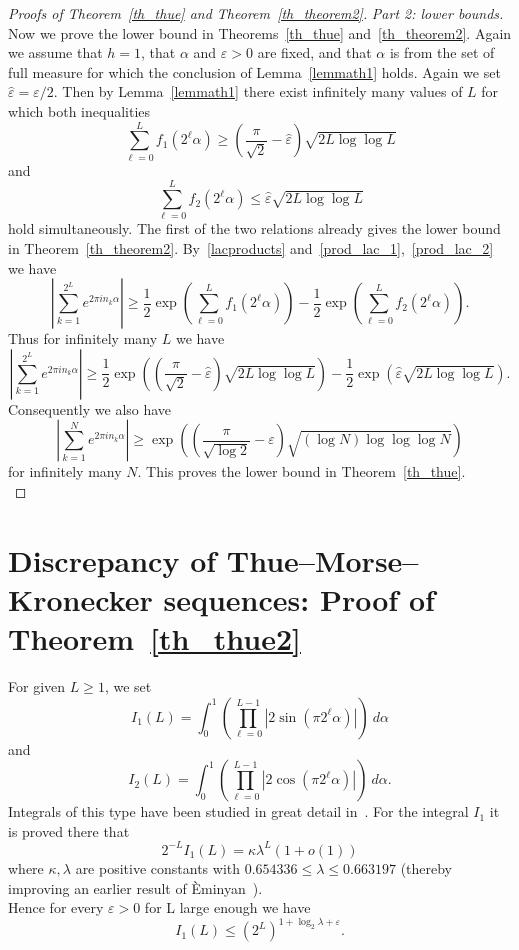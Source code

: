 \documentclass[12pt]{amsart}
\newcommand {\ve} {\varepsilon}
\begin{document}
\begin{proof}[Proofs of Theorem~\ref{th_thue} and Theorem~\ref{th_theorem2}]
\emph{Part 2: lower bounds.} \quad Now we prove the lower bound in Theorems~\ref{th_thue} and~\ref{th_theorem2}. Again we assume that $h=1$, that $\alpha$ and $\ve>0$ are fixed, and that $\alpha$ is from the set of full measure for which the conclusion of Lemma~\ref{lemmath1} holds. Again we set $\hat{\ve} = \ve/2$. Then by Lemma~\ref{lemmath1} there exist infinitely many values of $L$ for which both inequalities
$$
\sum_{\ell=0}^{L} f_1(2^\ell \alpha) \geq \left(\frac{\pi}{\sqrt{2}} - \hat{\ve}\right) \sqrt{2 L \log \log L}
$$
and
$$
\sum_{\ell=0}^{L} f_2(2^\ell \alpha) \leq \hat{\ve} \sqrt{2 L \log \log L}
$$
hold simultaneously. The first of the two relations already gives the lower bound in Theorem~\ref{th_theorem2}. By~\eqref{lacproducts} and~\eqref{prod_lac_1},~\eqref{prod_lac_2} we have
\begin{equation*} 
\left| \sum_{k=1}^{2^L} e^{2 \pi i n_k \alpha} \right| \geq \frac{1}{2} \exp \left(\sum_{\ell=0}^{L} f_1(2^\ell \alpha) \right) - \frac{1}{2} \exp\left(\sum_{\ell=0}^{L} f_2(2^\ell \alpha) \right).
\end{equation*}
Thus for infinitely many $L$ we have
\begin{equation} 
\left|\sum_{k=1}^{2^L} e^{2 \pi i n_k \alpha} \right| \geq \frac{1}{2} \exp \left(\left(\frac{\pi}{\sqrt{2}} - \hat{\ve}\right) \sqrt{2 L \log \log L}\right) - \frac{1}{2} \exp \left(\hat{\ve} \sqrt{2 L \log \log L}\right).
\end{equation}
Consequently we also have
$$
\left|\sum_{k=1}^{N} e^{2 \pi i n_k \alpha} \right| \geq \exp \left(\left(\frac{\pi}{\sqrt{\log 2}} - \ve \right) \sqrt{(\log N) \log \log \log N}\right)
$$
for infinitely many $N$. This proves the lower bound in Theorem~\ref{th_thue}.\\
\end{proof}

\section{Discrepancy of Thue--Morse--Kronecker sequences: Proof of Theorem~\ref{th_thue2}} \label{sect_proof_th2}

For given $L \geq 1$, we set
$$
I_1 (L) = \int_0^1 \left( \prod_{\ell=0}^{L-1} \left|2 \sin (\pi 2^\ell \alpha)\right| \right)~d\alpha
$$
and
$$
I_2 (L) = \int_0^1 \left( \prod_{\ell=0}^{L-1} \left|2 \cos(\pi 2^\ell \alpha)\right| \right)~d\alpha.
$$
Integrals of this type have been studied in great detail in~\cite{foumau}. For the integral $I_1$ it is proved there that
\begin{equation} \label{0664}
2^{-L} I_1(L) = \kappa \lambda^{L} \left(1+o(1)\right)
\end{equation}
where $\kappa,\lambda$ are positive constants with $0.654336 \leq \lambda \leq 0.663197$ (thereby improving an earlier result of {\`E}minyan~\cite{emin}).\\
Hence for every $\ve > 0$ for L large enough we have
\begin{equation} \label{0664b}
I_1 (L) \leq \left(2^{L}\right)^{1+\log_{2} \lambda + \varepsilon}.
\end{equation}
\end{document}
